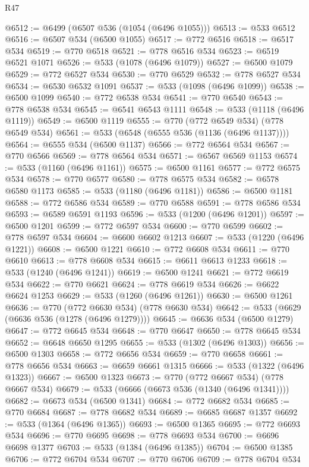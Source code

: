 \begin{lexlean}{R47}
\begin{coremodule}
@6512 := @6499 (@6507 @536 (@1054 (@6496 @1055)))
@6513 := @533 @6512
@6516 := @6507 @534 (@6500 @1055)
@6517 := @772 @6516
@6518 := @6517 @534
@6519 := @770 @6518
@6521 := @778 @6516 @534
@6523 := @6519 @6521 @1071
@6526 := @533 (@1078 (@6496 @1079))
@6527 := @6500 @1079
@6529 := @772 @6527 @534
@6530 := @770 @6529
@6532 := @778 @6527 @534
@6534 := @6530 @6532 @1091
@6537 := @533 (@1098 (@6496 @1099))
@6538 := @6500 @1099
@6540 := @772 @6538 @534
@6541 := @770 @6540
@6543 := @778 @6538 @534
@6545 := @6541 @6543 @1111
@6548 := @533 (@1118 (@6496 @1119))
@6549 := @6500 @1119
@6555 := @770 (@772 @6549 @534) (@778 @6549 @534)
@6561 := @533 (@6548 (@6555 @536 (@1136 (@6496 @1137))))
@6564 := @6555 @534 (@6500 @1137)
@6566 := @772 @6564 @534
@6567 := @770 @6566
@6569 := @778 @6564 @534
@6571 := @6567 @6569 @1153
@6574 := @533 (@1160 (@6496 @1161))
@6575 := @6500 @1161
@6577 := @772 @6575 @534
@6578 := @770 @6577
@6580 := @778 @6575 @534
@6582 := @6578 @6580 @1173
@6585 := @533 (@1180 (@6496 @1181))
@6586 := @6500 @1181
@6588 := @772 @6586 @534
@6589 := @770 @6588
@6591 := @778 @6586 @534
@6593 := @6589 @6591 @1193
@6596 := @533 (@1200 (@6496 @1201))
@6597 := @6500 @1201
@6599 := @772 @6597 @534
@6600 := @770 @6599
@6602 := @778 @6597 @534
@6604 := @6600 @6602 @1213
@6607 := @533 (@1220 (@6496 @1221))
@6608 := @6500 @1221
@6610 := @772 @6608 @534
@6611 := @770 @6610
@6613 := @778 @6608 @534
@6615 := @6611 @6613 @1233
@6618 := @533 (@1240 (@6496 @1241))
@6619 := @6500 @1241
@6621 := @772 @6619 @534
@6622 := @770 @6621
@6624 := @778 @6619 @534
@6626 := @6622 @6624 @1253
@6629 := @533 (@1260 (@6496 @1261))
@6630 := @6500 @1261
@6636 := @770 (@772 @6630 @534) (@778 @6630 @534)
@6642 := @533 (@6629 (@6636 @536 (@1278 (@6496 @1279))))
@6645 := @6636 @534 (@6500 @1279)
@6647 := @772 @6645 @534
@6648 := @770 @6647
@6650 := @778 @6645 @534
@6652 := @6648 @6650 @1295
@6655 := @533 (@1302 (@6496 @1303))
@6656 := @6500 @1303
@6658 := @772 @6656 @534
@6659 := @770 @6658
@6661 := @778 @6656 @534
@6663 := @6659 @6661 @1315
@6666 := @533 (@1322 (@6496 @1323))
@6667 := @6500 @1323
@6673 := @770 (@772 @6667 @534) (@778 @6667 @534)
@6679 := @533 (@6666 (@6673 @536 (@1340 (@6496 @1341))))
@6682 := @6673 @534 (@6500 @1341)
@6684 := @772 @6682 @534
@6685 := @770 @6684
@6687 := @778 @6682 @534
@6689 := @6685 @6687 @1357
@6692 := @533 (@1364 (@6496 @1365))
@6693 := @6500 @1365
@6695 := @772 @6693 @534
@6696 := @770 @6695
@6698 := @778 @6693 @534
@6700 := @6696 @6698 @1377
@6703 := @533 (@1384 (@6496 @1385))
@6704 := @6500 @1385
@6706 := @772 @6704 @534
@6707 := @770 @6706
@6709 := @778 @6704 @534

\end{coremodule}
\end{lexlean}
